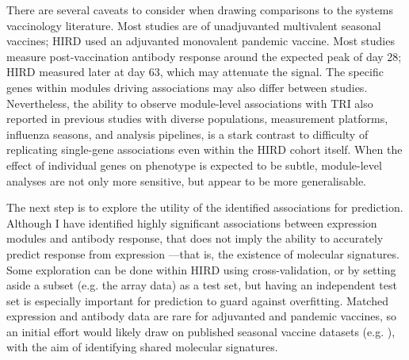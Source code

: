 There are several caveats to consider when drawing comparisons to the systems vaccinology literature.
Most studies are of unadjuvanted multivalent seasonal vaccines; \gls{HIRD} used an adjuvanted monovalent pandemic vaccine.
Most studies measure post-vaccination antibody response around the expected peak of day 28; \gls{HIRD} measured later at day 63, which may attenuate the signal.
The specific genes within modules driving associations may also differ between studies.
Nevertheless, the ability to observe module-level associations with \gls{TRI} also reported in previous studies with diverse populations, measurement platforms, influenza seasons, and analysis pipelines,
is a stark contrast to difficulty of replicating single-gene associations even within the \gls{HIRD} cohort itself.
When the effect of individual genes on phenotype is expected to be subtle,
module-level analyses are not only more sensitive, but appear to be more generalisable.

The next step is to explore the utility of the identified associations for prediction.
Although I have identified highly significant associations between expression modules and antibody response,
that does not imply the ability to accurately predict response from expression \autocite{tsang2014GlobalAnalysesHuman}---that is, the existence of molecular signatures.
Some exploration can be done within \gls{HIRD} using cross-validation, or by setting aside a subset (e.g. the array data) as a test set,
but having an independent test set is especially important for prediction to guard against overfitting.
Matched expression and antibody data are rare for adjuvanted and pandemic vaccines,
so an initial effort would likely draw on published seasonal vaccine datasets (e.g. \autocite{nakaya2015SystemsAnalysisImmunity,hipc-chisignaturesprojectteam2017MulticohortAnalysisReveals}),
with the aim of identifying shared molecular signatures.


